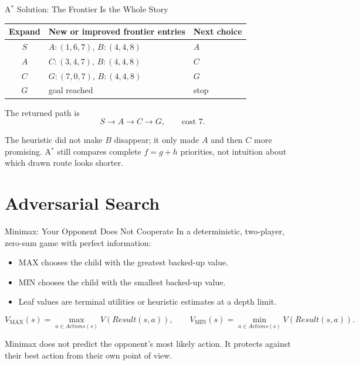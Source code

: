 \documentclass[aspectratio=169,10pt]{beamer}
\begin{document}
\begin{frame}{A$^*$ Solution: The Frontier Is the Whole Story}
  \small
  \begin{center}
    \renewcommand{\arraystretch}{1.4}
    \begin{tabular}{c|l|l}
      \textbf{Expand} & \textbf{New or improved frontier entries} & \textbf{Next choice} \\\hline
      $S$ & $A:(1,6,7)$, $B:(4,4,8)$ & $A$ \\
      $A$ & $C:(3,4,7)$, $B:(4,4,8)$ & $C$ \\
      $C$ & $G:(7,0,7)$, $B:(4,4,8)$ & $G$ \\
      $G$ & goal reached & stop
    \end{tabular}
  \end{center}
  The returned path is
  \[
    S\rightarrow A\rightarrow C\rightarrow G,
    \qquad \text{cost }7.
  \]
  \begin{keyidea}
    The heuristic did not make $B$ disappear; it only made $A$ and then $C$ more promising. A$^*$ still compares complete $f=g+h$ priorities, not intuition about which drawn route looks shorter.
  \end{keyidea}
\end{frame}

\section{Adversarial Search}

\begin{frame}{Minimax: Your Opponent Does Not Cooperate}
  In a deterministic, two-player, zero-sum game with perfect information:
  \begin{itemize}
    \item MAX chooses the child with the greatest backed-up value.
    \item MIN chooses the child with the smallest backed-up value.
    \item Leaf values are terminal utilities or heuristic estimates at a depth limit.
  \end{itemize}
  \[
    V_{\mathrm{MAX}}(s)=\max_{a\in Actions(s)}V(Result(s,a)),
    \qquad
    V_{\mathrm{MIN}}(s)=\min_{a\in Actions(s)}V(Result(s,a)).
  \]
  \begin{keyidea}
    Minimax does not predict the opponent's most likely action. It protects against their best action from their own point of view.
  \end{keyidea}
\end{frame}
\end{document}
